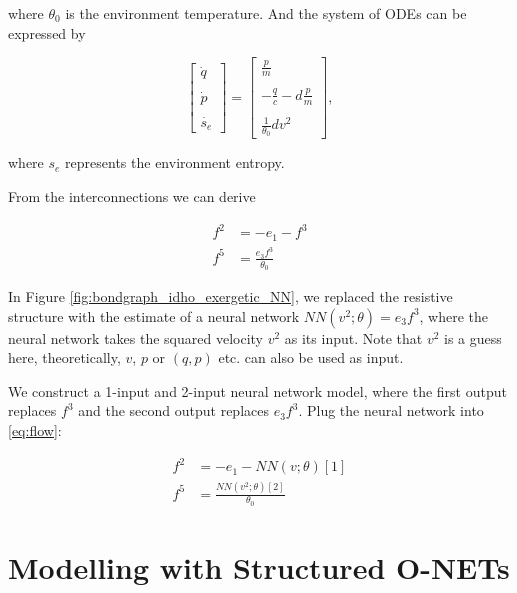 \documentclass[
	parskip, 			   %
	twoside, 			   %
	DIV=14, 			   %
	BCOR=15.0mm, 		   %
	headsepline, 		   %
	open=right, 		   %
	captions=tableheading, %
	bibliography=totoc,    %
	numbers=noenddot       %
]{scrreprt}
\begin{document}
where $\theta_0$ is the environment temperature. And the system of ODEs can be expressed by

\begin{equation}
    \label{eq:ODE_idho_EPHS}
    \begin{bmatrix}
    \dot{q}\\\\
    \dot{p}\\\\
    \dot{s_e}
    \end{bmatrix}
    =
    \begin{bmatrix}
    \frac{p}{m}\\\\
    -\frac{q}{c}-d\frac{p}{m}\\\\
    \frac{1}{\theta_0} d v^2
    \end{bmatrix},
\end{equation}

where $s_e$ represents the environment entropy.

From the interconnections we can derive 

\begin{equation}
    \label{eq:flow}
    \begin{aligned}
    f^2 &= -e_1 - f^3\\
    f^5 &= \frac{e_3 f^3}{\theta_0}
    \end{aligned}
\end{equation}

In Figure \ref{fig:bondgraph_idho_exergetic_NN}, we replaced the resistive structure with the estimate of a neural network $ NN(v^2; \theta ) = e_3 f^3$, where the neural network takes the squared velocity $v^2$ as its input. Note that $v^2$ is a guess here, theoretically, $v$, $p$ or $(q, p)$ etc. can also be used as input. 

We construct a 1-input and 2-input neural network model, where the first output replaces $f^3$ and the second output replaces $e_3 f^3$. Plug the neural network into \ref{eq:flow}:

\begin{equation}
    \label{eq:flow_with_NN}
    \begin{aligned}
    f^2 &= -e_1 - NN(v;\theta)[1]\\
    f^5 &= \frac{NN(v^2;\theta)[2]}{\theta_0}
    \end{aligned}
\end{equation}

\section{Modelling with Structured O-NETs}
\end{document}
